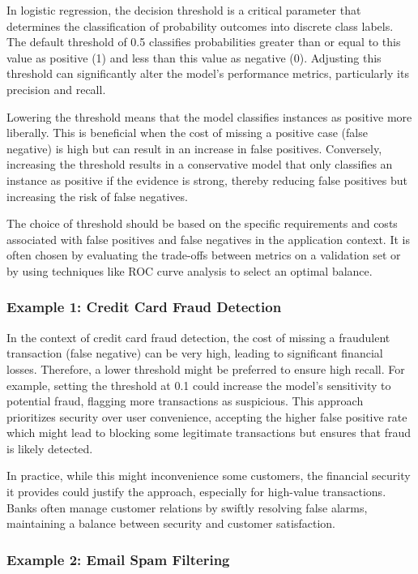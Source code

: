 \documentclass{article}
\theoremstyle{definition}
\theoremstyle{theorem}
\theoremstyle{theorem}
\theoremstyle{theorem}
\theoremstyle{theorem}
\theoremstyle{definition}
\theoremstyle{definition}
\theoremstyle{definition}
\theoremstyle{definition}
\theoremstyle{definition}
\begin{document}
In logistic regression, the decision threshold is a critical parameter that determines the classification of probability outcomes into discrete class labels. The default threshold of 0.5 classifies probabilities greater than or equal to this value as positive (1) and less than this value as negative (0). Adjusting this threshold can significantly alter the model's performance metrics, particularly its precision and recall.

Lowering the threshold means that the model classifies instances as positive more liberally. This is beneficial when the cost of missing a positive case (false negative) is high but can result in an increase in false positives. Conversely, increasing the threshold results in a conservative model that only classifies an instance as positive if the evidence is strong, thereby reducing false positives but increasing the risk of false negatives.

The choice of threshold should be based on the specific requirements and costs associated with false positives and false negatives in the application context. It is often chosen by evaluating the trade-offs between metrics on a validation set or by using techniques like ROC curve analysis to select an optimal balance.

\subsubsection*{Example 1: Credit Card Fraud Detection}

In the context of credit card fraud detection, the cost of missing a fraudulent transaction (false negative) can be very high, leading to significant financial losses. Therefore, a lower threshold might be preferred to ensure high recall. For example, setting the threshold at 0.1 could increase the model's sensitivity to potential fraud, flagging more transactions as suspicious. This approach prioritizes security over user convenience, accepting the higher false positive rate which might lead to blocking some legitimate transactions but ensures that fraud is likely detected.

In practice, while this might inconvenience some customers, the financial security it provides could justify the approach, especially for high-value transactions. Banks often manage customer relations by swiftly resolving false alarms, maintaining a balance between security and customer satisfaction.

\subsubsection*{Example 2: Email Spam Filtering}
\end{document}

